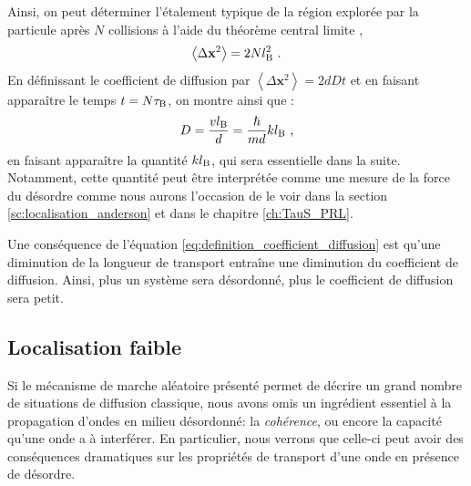 Ainsi, on peut déterminer l'étalement typique de la région explorée par la particule après $N$ collisions à l'aide du théorème central limite \citep{diu1989elements},
\begin{equation}
\left\langle \Delta \mathbf{x}^2 \right\rangle=2 N l_{\mathrm{B}}^2 \text{ .}
\end{equation}
En définissant le coefficient de diffusion par $ \left\langle \Delta \mathbf{x}^2 \right\rangle = 2 d D t$ et en faisant apparaître le temps $t=N \tau_{\mathrm{B}}$, on montre ainsi que \citep{akkermans2007mesoscopic}:
\begin{equation}
D=\frac{v l_{\mathrm{B}}}{d}=\frac{\hslash}{m d} k l_{\mathrm{B}} \text{ ,}
\label{eq:definition_coefficient_diffusion}
\end{equation}
en faisant apparaître la quantité $k l_{\mathrm{B}}$, qui sera essentielle dans la suite. Notamment, cette quantité peut être interprétée comme une mesure de la force du désordre comme nous aurons l'occasion de le voir dans la section \ref{sc:localisation_anderson} et dans le chapitre \ref{ch:TauS_PRL}.

Une conséquence de l'équation \ref{eq:definition_coefficient_diffusion} est qu'une diminution de la longueur de transport entraîne une diminution du coefficient de diffusion. Ainsi, plus un système sera désordonné, plus le coefficient de diffusion sera petit.














\subsection{Localisation faible}
\label{sc:weak_localisation}
Si le mécanisme de marche aléatoire présenté permet de décrire un grand nombre de situations de diffusion classique, nous avons omis un ingrédient essentiel à la propagation d'ondes en milieu désordonné: la \emph{cohérence}, ou encore la capacité qu'une onde a à interférer. En particulier, nous verrons que celle-ci peut avoir des conséquences dramatiques sur les propriétés de transport d'une onde en présence de désordre.

